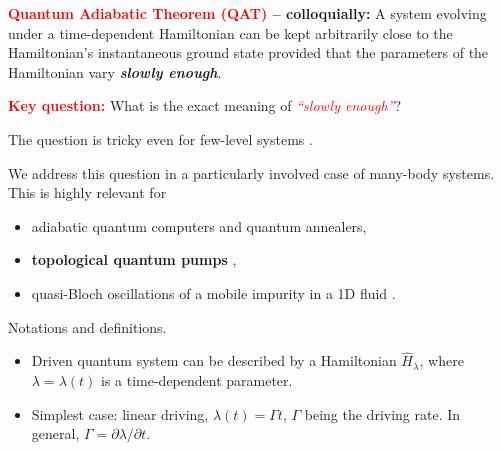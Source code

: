 \documentclass[portratit,a0paper,fontscale=0.48]{baposter} %
\renewcommand{\H}{\hat H}
\begin{document}
\begin{poster}

{

\begin{multicols}{3}
{
\large

{\bf \cal \textcolor{red}{Quantum Adiabatic Theorem (QAT)} -- colloquially:} A system evolving under a time-dependent
Hamiltonian can be kept arbitrarily close to the Hamiltonian's
instantaneous ground state provided that the parameters of the Hamiltonian
vary {\bf \it slowly enough}.

\vspace{6 pt}

 \textbf{\textcolor{red}{Key question:}} What is the exact meaning of \textit{\textcolor{red}{``slowly enough''}}?

\vspace{6 pt}

The question is tricky even for few-level systems \cite{marzlin2004inconsistency,tong2005quantitative}.

\vspace{6 pt}

We address this question in a particularly involved case of many-body systems. This is highly relevant for
\begin{itemize}
\item adiabatic quantum computers and quantum annealers,
\item {\bf topological quantum pumps} \cite{nakajima2016topological,lohse2015thouless},
\item quasi-Bloch oscillations of a mobile impurity in a 1D fluid \cite{meinert2016bloch}.
\end{itemize}

}

\newpage

Notations and definitions.

\begin{itemize}

\item
Driven quantum system can be described by a Hamiltonian $\H_{\lambda}$, where
$\lambda=\lambda(t)$ is a time-dependent parameter.

\item Simplest case: linear driving, $\lambda(t)=\Gamma t$, $\Gamma$ being the driving rate. In general,
$\Gamma=\partial \lambda/\partial t$.


\end{itemize}
\end{multicols}}
\end{poster}
\end{document}
